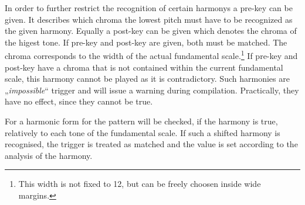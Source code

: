 In order to further restrict the recognition of certain harmonys a
pre-key can be given. It describes which chroma the
lowest pitch must have to be recognized as the given harmony. Equally
a post-key can be given which denotes the chroma of the higest
tone. If pre-key and post-key are given, both must be matched. The
chroma corresponds to the width of the actual fundamental
scale.\footnote{This width is not fixed to 12, but can be freely
  choosen inside wide margins.} If pre-key and post-key have a chroma
that is not contained within the current fundamental scale, this
harmony cannot be played as it is contradictory. Such harmonies are
„\textit{impossible}“ trigger and will issue
a warning during compilation. Practically, they have no effect, since
they cannot be true.

\iffalse
Harmonie-Auslöser\index{Auslöser!Harmonie}
 können wahlweise eine Harmonie oder eine Harmonieform
\index{Auslöser!Harmonie-Form}
erkennen. Die Harmonie wird beim Namen genannt und die enthaltenen
Tasten-Nummern beziehen sich auf die entsprechenden Ton-Nummern der
Fundamentaltonleiter\index{Fundamentaltonleiter}.
Alle gedrückten Tasten werden in die
Fundamentaltonleiter hineinprojiziert und das entstehende Tastenmuster
wird mit der Harmonie verglichen. Bei Übereinstimmung gilt die
Harmonie als erkannt. Tasten, die in der Harmonie mit einem
Stern (*)\index{**@*} gekennzeichnet sind, werden bei diesem
Vergleich nicht berücksichtigt.
Einschränkenderweise kann man mit der Vortaste\index{Vortaste} angeben,
welche Tonigkeit\index{Tonigkeit}
der tiefste Ton haben muss, damit diese Harmonie gilt. Entsprechend muss
bei Angabe der Nachtaste\index{Nachtaste} der höchste Ton
die Tonigkeit der Nachtaste
haben. Bei Angabe von Vortaste und Nachtaste müssen beide Bedingungen
erfüllt sein. Die Tonigkeit eines Tons bezieht sich hier auf die Breite
der aktuellen Fundamentaltonleiter.\footnote{Diese Breite ist nicht
auf 12 festgelegt, sondern in weiten Grenzen frei wählbar.}
Wenn Vortaste oder Nachtaste eine Tonigkeit haben, die nicht in der
Harmonie vorkommt, so kann diese Harmonie nicht gespielt werden, da sie
sich selbst widerspricht. Solche Harmonien sind '{\it unmögliche}'
Auslöser\index{Auslöser!unmögliche}
 und werden mit einer Warnung gekennzeichnet. Praktisch
bleiben sie ohne Effekt, da sie nie zutreffen können.
\fi

For a harmonic form for the pattern will be
checked, if the harmony is true, relatively to each tone of the
fundamental scale. If such a shifted harmony is recognised, the
trigger is treated as matched and the value  is set
according to the analysis of the harmony.


